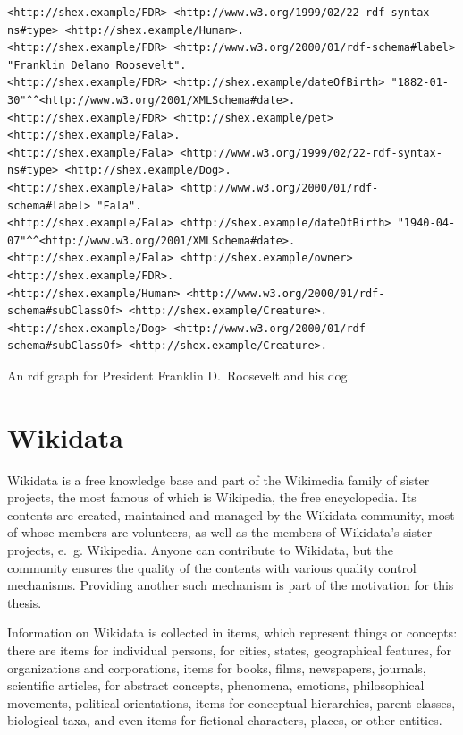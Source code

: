 \begin{sidewayslstfloat}
\begin{lstlisting}
<http://shex.example/FDR> <http://www.w3.org/1999/02/22-rdf-syntax-ns#type> <http://shex.example/Human>.
<http://shex.example/FDR> <http://www.w3.org/2000/01/rdf-schema#label> "Franklin Delano Roosevelt".
<http://shex.example/FDR> <http://shex.example/dateOfBirth> "1882-01-30"^^<http://www.w3.org/2001/XMLSchema#date>.
<http://shex.example/FDR> <http://shex.example/pet> <http://shex.example/Fala>.
<http://shex.example/Fala> <http://www.w3.org/1999/02/22-rdf-syntax-ns#type> <http://shex.example/Dog>.
<http://shex.example/Fala> <http://www.w3.org/2000/01/rdf-schema#label> "Fala".
<http://shex.example/Fala> <http://shex.example/dateOfBirth> "1940-04-07"^^<http://www.w3.org/2001/XMLSchema#date>.
<http://shex.example/Fala> <http://shex.example/owner> <http://shex.example/FDR>.
<http://shex.example/Human> <http://www.w3.org/2000/01/rdf-schema#subClassOf> <http://shex.example/Creature>.
<http://shex.example/Dog> <http://www.w3.org/2000/01/rdf-schema#subClassOf> <http://shex.example/Creature>.
\end{lstlisting}
\caption{An \gls{rdf} graph for President Franklin D.~Roosevelt and his dog.}
\label{lst:rdf-example}
\end{sidewayslstfloat}

\section{Wikidata}
\label{sec:Background:Wikidata}

\gls{Wikidata} \cite{Vrandecic:2014:WFC:2661061.2629489} %
is a free knowledge base
and part of the \gls{Wikimedia} family of sister projects,
the most famous of which is \gls{Wikipedia}, the free encyclopedia.
Its contents are created, maintained and managed by the \gls{Wikidata} community,
most of whose members are volunteers,
as well as the members of \gls{Wikidata}’s sister projects, e.~g. \gls{Wikipedia}.
Anyone can contribute to \gls{Wikidata},
but the community ensures the quality of the contents with various quality control mechanisms.
Providing another such mechanism is part of the motivation for this thesis.

Information on \gls{Wikidata} is collected in \glspl{item},
which represent things or concepts:
there are \glspl{item} for individual persons,
for cities, states, geographical features,
for organizations and corporations,
\glspl{item} for books, films, newspapers, journals, scientific articles,
for abstract concepts, phenomena, emotions, philosophical movements, political orientations,
\glspl{item} for conceptual hierarchies, parent classes, biological taxa,
and even \glspl{item} for fictional characters, places, or other entities.

